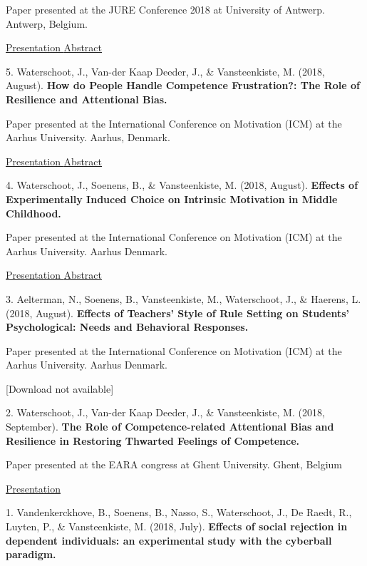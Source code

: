 \documentclass[
]{article}
\begin{document}
Paper presented at the JURE Conference 2018 at University of Antwerp.
Antwerp, Belgium.

\href{download/presentations/Presentation_JURE_050718.pdf}{Presentation
} \textbar{}
\href{download/presentations/Abstract_Choice_JURE_Antwerp.pdf}{Abstract
}

5. Waterschoot, J., Van-der Kaap Deeder, J., \& Vansteenkiste, M. (2018,
August). \textbf{How do People Handle Competence Frustration?: The Role
of Resilience and Attentional Bias.}

Paper presented at the International Conference on Motivation (ICM) at
the Aarhus University. Aarhus, Denmark.

\href{download/presentations/Presentation_ICM18_Resilience.key}{Presentation
} \textbar{}
\href{download/presentations/Abstract_ResilienceAB_Denmark.docx}{Abstract
}

4. Waterschoot, J., Soenens, B., \& Vansteenkiste, M. (2018, August).
\textbf{Effects of Experimentally Induced Choice on Intrinsic Motivation
in Middle Childhood.}

Paper presented at the International Conference on Motivation (ICM) at
the Aarhus University. Aarhus Denmark.

\href{download/presentations/Presentation_ICM18_Choice.key}{Presentation
} \textbar{}
\href{download/presentations/Abstract_Choice_Denmark.docx}{Abstract }

3. Aelterman, N., Soenens, B., Vansteenkiste, M., Waterschoot, J., \&
Haerens, L. (2018, August). \textbf{Effects of Teachers' Style of Rule
Setting on Students' Psychological: Needs and Behavioral Responses.}

Paper presented at the International Conference on Motivation (ICM) at
the Aarhus University. Aarhus Denmark.

{[}Download not available{]}

2. Waterschoot, J., Van-der Kaap Deeder, J., \& Vansteenkiste, M. (2018,
September). \textbf{The Role of Competence-related Attentional Bias and
Resilience in Restoring Thwarted Feelings of Competence.}

Paper presented at the EARA congress at Ghent University. Ghent, Belgium

\href{download/presentations/Presentation_EARA18_Resilience.key}{Presentation
}

1. Vandenkerckhove, B., Soenens, B., Nasso, S., Waterschoot, J., De
Raedt, R., Luyten, P., \& Vansteenkiste, M. (2018, July).
\textbf{Effects of social rejection in dependent individuals: an
experimental study with the cyberball paradigm.}
\end{document}
